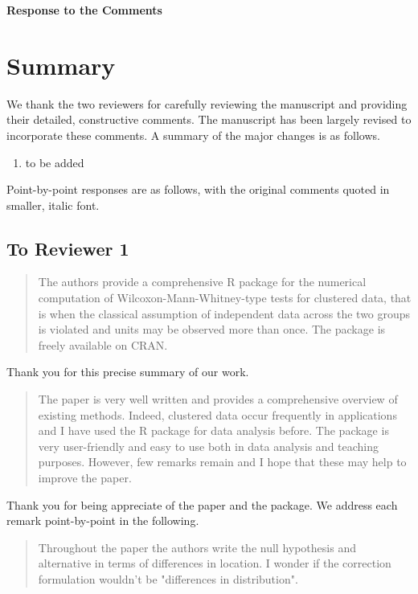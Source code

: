 \documentclass[12pt]{article}
\newenvironment{comment}%
{\begin{quotation}\noindent\small\it\ignorespaces%
  }{\end{quotation}}
\begin{document}
\begin{center}
  {\Large\bf Response to the Comments}
\end{center}

\section*{Summary}

We thank the two reviewers for carefully reviewing the manuscript and
providing their detailed, constructive comments.
The manuscript has been largely revised to incorporate these comments.
A summary of the major changes is as follows.

\begin{enumerate}
\item to be added
\end{enumerate}

Point-by-point responses are as follows, with the original comments
quoted in smaller, italic font.


\subsection*{To Reviewer 1}

\begin{comment}
  The authors provide a comprehensive R package for the numerical computation of
Wilcoxon-Mann-Whitney-type tests for clustered data, that is when the classical
assumption of independent data across the two groups is violated and units may be
observed more than once. The package is freely available on CRAN.
\end{comment}
Thank you for this precise summary of our work.

\begin{comment}
The paper is very well written and provides a comprehensive overview of existing
methods. Indeed, clustered data occur frequently in applications and I have used the
R package for data analysis before. The package is very user-friendly and easy to
use both in data analysis and teaching purposes. However, few remarks remain and I
hope that these may help to improve the paper.
\end{comment}

Thank you for being appreciate of the paper and the package. We address each
remark point-by-point in the following.

\begin{comment}
Throughout the paper the authors write the null hypothesis and alternative in
terms of differences in location. I wonder if the correction formulation wouldn't
be "differences in distribution".
\end{comment}
\end{document}
